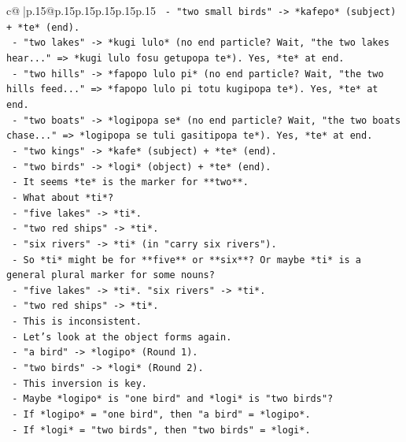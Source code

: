 \documentclass{article}
\begin{document}
{\begin{supertabular}{c@{$\;$}|p{.15\linewidth}@{}p{.15\linewidth}p{.15\linewidth}p{.15\linewidth}p{.15\linewidth}p{.15\linewidth}}
{{{\texttt{          {-} "two small birds" {-}> *kafepo* (subject) + *te* (end).} \\
\texttt{          {-} "two lakes" {-}> *kugi lulo* (no end particle? Wait, "the two lakes hear..." => *kugi lulo fosu getupopa te*). Yes, *te* at end.} \\
\texttt{          {-} "two hills" {-}> *fapopo lulo pi* (no end particle? Wait, "the two hills feed..." => *fapopo lulo pi totu kugipopa te*). Yes, *te* at end.} \\
\texttt{          {-} "two boats" {-}> *logipopa se* (no end particle? Wait, "the two boats chase..." => *logipopa se tuli gasitipopa te*). Yes, *te* at end.} \\
\texttt{          {-} "two kings" {-}> *kafe* (subject) + *te* (end).} \\
\texttt{          {-} "two birds" {-}> *logi* (object) + *te* (end).} \\
\texttt{        {-} It seems *te* is the marker for **two**.} \\
\texttt{        {-} What about *ti*?} \\
\texttt{          {-} "five lakes" {-}> *ti*.} \\
\texttt{          {-} "two red ships" {-}> *ti*.} \\
\texttt{          {-} "six rivers" {-}> *ti* (in "carry six rivers").} \\
\texttt{          {-} So *ti* might be for **five** or **six**? Or maybe *ti* is a general plural marker for some nouns?} \\
\texttt{          {-} "five lakes" {-}> *ti*. "six rivers" {-}> *ti*.} \\
\texttt{          {-} "two red ships" {-}> *ti*.} \\
\texttt{          {-} This is inconsistent.} \\
\texttt{        {-} Let's look at the object forms again.} \\
\texttt{          {-} "a bird" {-}> *logipo* (Round 1).} \\
\texttt{          {-} "two birds" {-}> *logi* (Round 2).} \\
\texttt{          {-} This inversion is key.} \\
\texttt{          {-} Maybe *logipo* is "one bird" and *logi* is "two birds"?} \\
\texttt{          {-} If *logipo* = "one bird", then "a bird" = *logipo*.} \\
\texttt{          {-} If *logi* = "two birds", then "two birds" = *logi*.} \\
}}}
\end{supertabular}}
\end{document}
